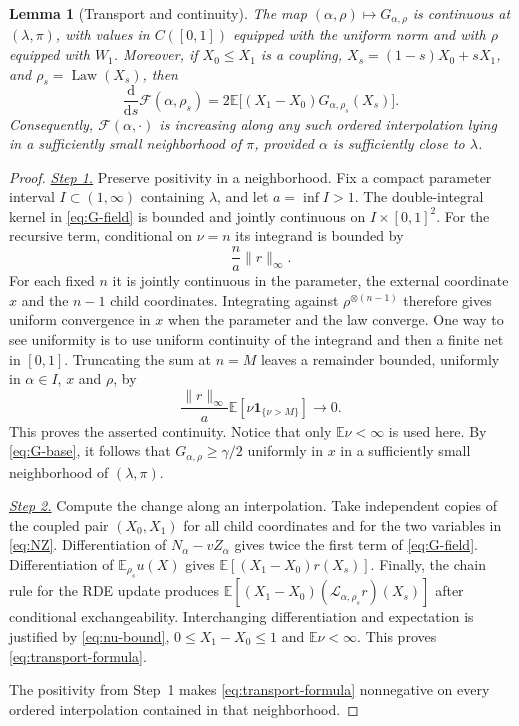 \documentclass[11pt,a4paper]{article}
\numberwithin{equation}{section}
\theoremstyle{notethm}
\newtheorem{lemma}[lemma]{Lemma}
\theoremstyle{definition}
\newcommand{\E}{\mathbb E}
\newcommand{\Law}{\operatorname{Law}}
\newcommand{\cL}{\mathcal L}
\newcommand{\cF}{\mathscr F}
\begin{document}
\begin{lemma}[Transport and continuity]\label{lem:transport}
The map $(\alpha,\rho)\mapsto G_{\alpha,\rho}$ is continuous at
$(\lambda,\pi)$, with values in $C([0,1])$ equipped with the uniform norm and
with $\rho$ equipped with $W_1$.
Moreover, if $X_0\le X_1$ is a coupling, $X_s=(1-s)X_0+sX_1$, and
$\rho_s=\Law(X_s)$, then
\begin{equation}\label{eq:transport-formula}
 \frac{\mathrm d}{\mathrm ds}\cF(\alpha,\rho_s)
 =2\E\bigl[(X_1-X_0)G_{\alpha,\rho_s}(X_s)\bigr].
\end{equation}
Consequently, $\cF(\alpha,\cdot)$ is increasing along any such ordered
interpolation lying in a sufficiently small neighborhood of $\pi$, provided
$\alpha$ is sufficiently close to $\lambda$.
\end{lemma}

\begin{proof}
\smallskip\noindent
\underline{\textit{Step 1.}} Preserve positivity in a neighborhood.
Fix a compact parameter interval $I\subset(1,\infty)$ containing $\lambda$,
and let $a=\inf I>1$. The double-integral kernel in \eqref{eq:G-field} is
bounded and jointly continuous on $I\times[0,1]^2$.
For the recursive term, conditional on $\nu=n$ its integrand is bounded by
\begin{equation}\label{eq:nu-bound}
 \frac{n}{a}\|r\|_\infty.
\end{equation}
For each fixed $n$ it is jointly continuous in the parameter, the external
coordinate $x$ and the $n-1$ child coordinates. Integrating against
$\rho^{\otimes(n-1)}$ therefore gives uniform convergence in $x$ when the
parameter and the law converge. One way to see uniformity is to use uniform
continuity of the integrand and then a finite net in $[0,1]$.
Truncating the sum at $n=M$ leaves a remainder bounded, uniformly in
$\alpha\in I$, $x$ and $\rho$, by
\begin{equation}\label{eq:nu-tail}
 \frac{\|r\|_\infty}{a}\E[\nu\mathbf1_{\{\nu>M\}}]\longrightarrow0.
\end{equation}
This proves the asserted continuity. Notice that only $\E\nu<\infty$ is
used here. By \eqref{eq:G-base}, it follows that
$G_{\alpha,\rho}\ge\gamma/2$ uniformly in $x$ in a sufficiently small
neighborhood of $(\lambda,\pi)$.

\smallskip\noindent
\underline{\textit{Step 2.}} Compute the change along an interpolation.
Take independent copies of the coupled pair
$(X_0,X_1)$ for all child coordinates and for the two variables in
\eqref{eq:NZ}. Differentiation of $N_\alpha-vZ_\alpha$ gives twice the first
term of \eqref{eq:G-field}. Differentiation of $\E_{\rho_s}u(X)$ gives
$\E[(X_1-X_0)r(X_s)]$. Finally, the chain rule for the RDE update produces
$\E[(X_1-X_0)(\cL_{\alpha,\rho_s}r)(X_s)]$ after conditional
exchangeability. Interchanging differentiation and expectation is justified
by \eqref{eq:nu-bound}, $0\le X_1-X_0\le1$ and $\E\nu<\infty$.
This proves \eqref{eq:transport-formula}.

The positivity from Step~1 makes \eqref{eq:transport-formula} nonnegative
on every ordered interpolation contained in that neighborhood.
\end{proof}
\end{document}
